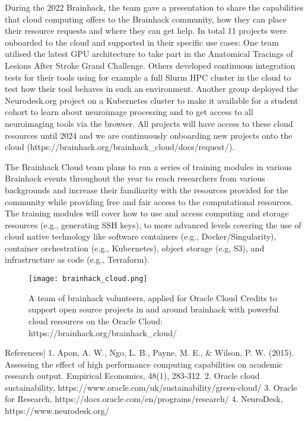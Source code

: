 \documentclass[../main.tex]{subfiles}
\begin{document}
During the 2022 Brainhack, the team gave a presentation to share the capabilities that cloud computing offers to the Brainhack community, how they can place their resource requests and where they can get help. In total 11 projects were onboarded to the cloud and supported in their specific use cases: One team utilised the latest GPU architecture to take part in the Anatomical Tracings of Lesions After Stroke Grand Challenge. Others developed continuous integration tests for their tools using for example a full Slurm HPC cluster in the cloud to test how their tool behaves in such an environment. Another group deployed the Neurodesk.org \parencite{neurodesk} project on a Kubernetes cluster to make it available for a student cohort to learn about neuroimage processing and to get access to all neuroimaging tools via the browser. All projects will have access to these cloud resources until 2024 and we are continuously onboarding new projects onto the cloud (https://brainhack.org/brainhack_cloud/docs/request/).

The Brainhack Cloud team plans to run a series of training modules in various Brainhack events throughout the year to reach researchers from various backgrounds and increase their familiarity with the resources provided for the community while providing free and fair access to the computational resources. The training modules will cover how to use and access computing and storage resources (e.g., generating SSH keys), to more advanced levels covering the use of cloud native technology like software containers (e.g., Docker/Singularity), container orchestration (e.g., Kubernetes), object storage (e.g, S3), and infrastructure as code (e.g., Terraform).

\begin{figure}
    \centering
    \texttt{[image: brainhack\_cloud.png]}
    \caption{A team of brainhack volunteers, applied for Oracle Cloud Credits to support open source projects in and around brainhack with powerful cloud resources on the Oracle Cloud: https://brainhack.org/brainhack_cloud/
    }
    \label{fig:test}
\end{figure}


References|
    1. Apon, A. W., Ngo, L. B., Payne, M. E., & Wilson, P. W. (2015). Assessing the effect of high performance computing capabilities on academic research output. Empirical Economics, 48(1), 283-312.
    2. Oracle cloud sustainability, https://www.oracle.com/uk/sustainability/green-cloud/
    3. Oracle for Research, https://docs.oracle.com/en/programs/research/
    4. NeuroDesk, https://www.neurodesk.org/


\printbibliography
\end{document}
